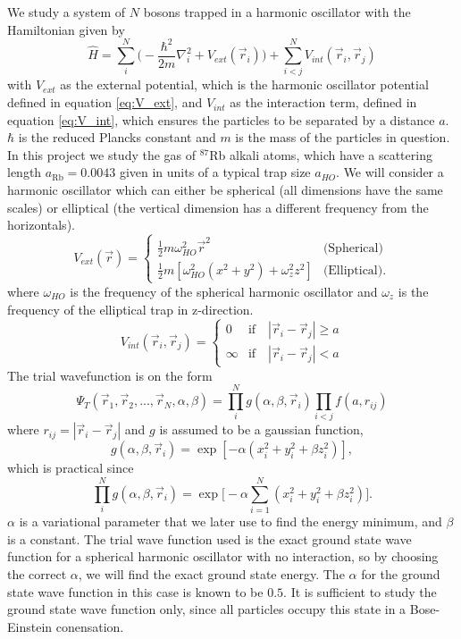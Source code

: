 \documentclass[norsk,a4paper,12pt]{article}
\begin{document}
We study a system of $N$ bosons trapped in a harmonic oscillator with the Hamiltonian given by 
\begin{equation}
\hat{H}=\sum_i^N\bigg(-\frac{\hbar^2}{2m}\nabla_i^2+V_{ext}(\vec{r}_i)\bigg)+\sum_{i<j}^NV_{int}(\vec{r}_i,\vec{r}_j)
\label{eq:Hamilton}
\end{equation}
with $V_{ext}$ as the external potential, which is the harmonic oscillator potential defined in equation \ref{eq:V_ext}, and $V_{int}$ as the interaction term, defined in equation \ref{eq:V_int}, which ensures the particles to be separated by a distance $a$. $\hbar$ is the reduced Plancks constant and $m$ is the mass of the particles in question. In this project we study the gas of $^{87}$Rb alkali atoms, which have a scattering length $a_{\text{Rb}}=0.0043$ given in units of a typical trap size $a_{HO}$. We will consider a harmonic oscillator which can either be spherical (all dimensions have the same scales) or elliptical (the vertical dimension has a different frequency from the horizontals).
\begin{equation}
\label{eq:V_ext}
V_{ext}(\vec{r})=
\begin{cases} 
   \frac{1}{2}m\omega_{HO}^2\vec{r}^2 & \text{(Spherical)} \\
   \frac{1}{2}m[\omega_{HO}^2(x^2 + y^2) + \omega_z^2z^2] & \text{(Elliptical)}.
\end{cases}
\end{equation}
where $\omega_{HO}$ is the frequency of the spherical harmonic oscillator and $\omega_z$ is the frequency of the elliptical trap in z-direction. 
\begin{equation}
\label{eq:V_int}
V_{int}(\vec{r}_i, \vec{r}_j)=
\begin{cases} 
0 & \text{if}\quad |\vec{r}_i-\vec{r}_j| \geq a \\
\infty & \text{if}\quad |\vec{r}_i-\vec{r}_j| < a
\end{cases}
\end{equation}
The trial wavefunction is on the form 
\begin{equation}
\Psi_T(\vec{r}_1, \vec{r}_2, ..., \vec{r}_N, \alpha, \beta)=\prod_i^Ng(\alpha, \beta, \vec{r}_i)\prod_{i<j}f(a,r_{ij})
\label{eq:WF}
\end{equation}
where $r_{ij}=|\vec{r}_i-\vec{r}_j|$ and $g$ is assumed to be a gaussian function,
\begin{equation}
g(\alpha, \beta, \vec{r}_i)=\exp[-\alpha(x_i^2+y_i^2+\beta z_i^2)],
\end{equation}
which is practical since
\begin{equation}
\prod_i^Ng(\alpha, \beta, \vec{r}_i)=\exp\Big[-\alpha\sum_{i=1}^N(x_i^2+y_i^2+\beta z_i^2)\Big].
\end{equation}
$\alpha$ is a variational parameter that we later use to find the energy minimum, and $\beta$ is a constant. The trial wave function used is the exact ground state wave function for a spherical harmonic oscillator with no interaction, so by choosing the correct $\alpha$, we will find the exact ground state energy. The $\alpha$ for the ground state wave function in this case is known to be $0.5$. It is sufficient to study the ground state wave function only, since all particles occupy this state in a Bose-Einstein conensation.
\end{document}
